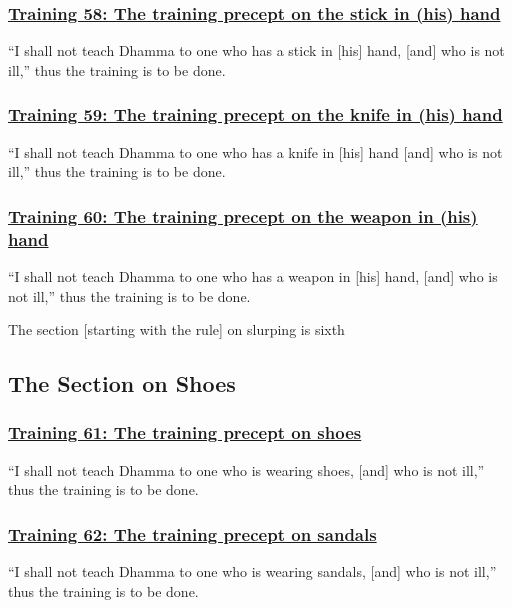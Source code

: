 \subsubsection*{\hyperref[sekh58]{Training 58: The training precept on the stick in (his) hand}}
\label{training58}
``I shall not teach Dhamma to one who has a stick in [his] hand, [and] who is not ill,'' thus the training is to be done.

\subsubsection*{\hyperref[sekh59]{Training 59: The training precept on the knife in (his) hand}}
\label{training59}
``I shall not teach Dhamma to one who has a knife in [his] hand [and] who is not ill,'' thus the training is to be done.

\subsubsection*{\hyperref[sekh60]{Training 60: The training precept on the weapon in (his) hand}}
\label{training60}
``I shall not teach Dhamma to one who has a weapon in [his] hand, [and] who is not ill,'' thus the training is to be done.

\begin{center}
  The section [starting with the rule] on slurping is sixth
\end{center}

\setsubsecheadstyle{\subsectionFmt}
\subsection{The Section on Shoes}
\vspace{0.2cm}

\subsubsection*{\hyperref[sekh61]{Training 61: The training precept on shoes}}
\label{training61}
``I shall not teach Dhamma to one who is wearing shoes, [and] who is not ill,'' thus the training is to be done.

\subsubsection*{\hyperref[sekh62]{Training 62: The training precept on sandals}}
\label{training62}
``I shall not teach Dhamma to one who is wearing sandals, [and] who is not ill,'' thus the training is to be done.

